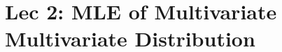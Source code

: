 \chapter[Lec 2: MLE of Multivariate Multivariate Distribution]{Lec 2: MLE of Multivariate\\ Multivariate Distribution}

